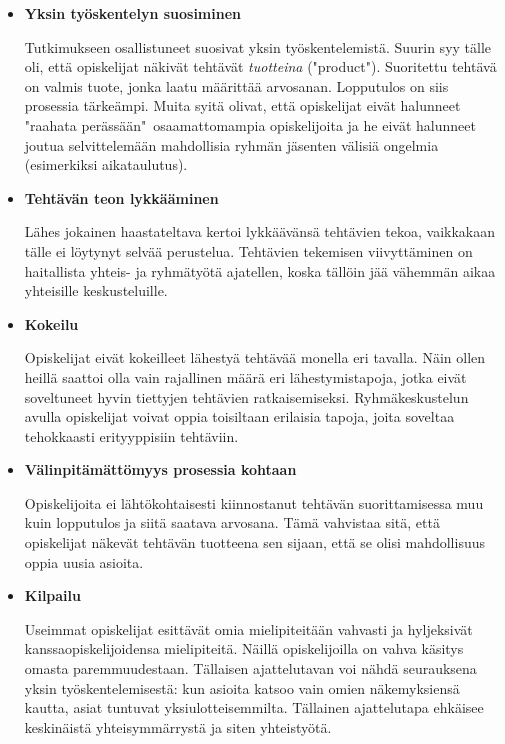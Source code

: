 \documentclass[finnish]{../tktltiki2}
\theoremstyle{definition}
\theoremstyle{remark}
\begin{document}
\begin{itemize}

\item {\bf Yksin työskentelyn suosiminen}

Tutkimukseen osallistuneet suosivat yksin työskentelemistä. Suurin syy tälle oli, että opiskelijat näkivät tehtävät \emph{tuotteina} ("product"). Suoritettu tehtävä on valmis tuote, jonka laatu määrittää arvosanan. Lopputulos on siis prosessia tärkeämpi. Muita syitä olivat, että opiskelijat eivät halunneet "raahata perässään"~osaamattomampia opiskelijoita ja he eivät halunneet joutua selvittelemään mahdollisia ryhmän jäsenten välisiä ongelmia (esimerkiksi aikataulutus).

\item {\bf Tehtävän teon lykkääminen}

Lähes jokainen haastateltava kertoi lykkäävänsä tehtävien tekoa, vaikkakaan tälle ei löytynyt selvää perustelua. Tehtävien tekemisen viivyttäminen on haitallista yhteis- ja ryhmätyötä ajatellen, koska tällöin jää vähemmän aikaa yhteisille keskusteluille.

\item {\bf Kokeilu}

Opiskelijat eivät kokeilleet lähestyä tehtävää monella eri tavalla. Näin ollen heillä saattoi olla vain rajallinen määrä eri lähestymistapoja, jotka eivät soveltuneet hyvin tiettyjen tehtävien ratkaisemiseksi. Ryhmäkes\-kustelun avulla opiskelijat voivat oppia toisiltaan erilaisia tapoja, joita soveltaa tehokkaasti erityyppisiin tehtäviin.

\item {\bf Välinpitämättömyys prosessia kohtaan}

Opiskelijoita ei lähtökohtaisesti kiinnostanut tehtävän suorittamisessa muu kuin lopputulos ja siitä saatava arvosana. Tämä vahvistaa sitä, että opiskelijat näkevät tehtävän tuotteena sen sijaan, että se olisi mahdollisuus oppia uusia asioita.

\item {\bf Kilpailu}

Useimmat opiskelijat esittävät omia mielipiteitään vahvasti ja hyljeksivät kanssaopiskelijoidensa mielipiteitä. Näillä opiskelijoilla on vahva käsitys omasta paremmuudestaan. Tällaisen ajattelutavan voi nähdä seurauksena yksin työskentelemisestä: kun asioita katsoo vain omien näkemyksiensä kautta, asiat tuntuvat yksiulotteisemmilta. Tällainen ajattelutapa ehkäisee keskinäistä yhteisymmärrystä ja siten yhteistyötä.


\end{itemize}
\end{document}
